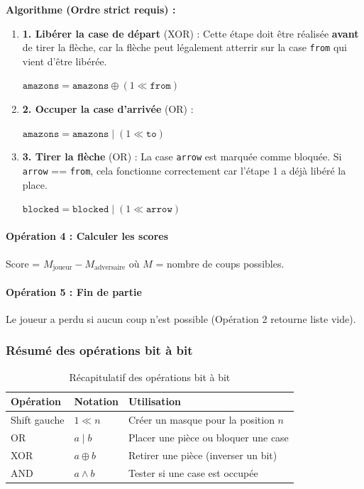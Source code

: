 \documentclass[a4paper]{article}
\begin{document}
\textbf{Algorithme (Ordre strict requis) :}
\begin{enumerate}
    \item \textbf{1. Libérer la case de départ} (XOR) :
    Cette étape doit être réalisée \textbf{avant} de tirer la flèche, car la flèche peut légalement atterrir sur la case \texttt{from} qui vient d'être libérée.
    \begin{center}
    $\texttt{amazons} = \texttt{amazons} \oplus (1 \ll \texttt{from})$
    \end{center}
    
    \item \textbf{2. Occuper la case d'arrivée} (OR) :
    \begin{center}
    $\texttt{amazons} = \texttt{amazons} \mid (1 \ll \texttt{to})$
    \end{center}
    
    \item \textbf{3. Tirer la flèche} (OR) :
    La case \texttt{arrow} est marquée comme bloquée. Si \texttt{arrow} == \texttt{from}, cela fonctionne correctement car l'étape 1 a déjà libéré la place.
    \begin{center}
    $\texttt{blocked} = \texttt{blocked} \mid (1 \ll \texttt{arrow})$
    \end{center}
\end{enumerate}

\paragraph{Opération 4 : Calculer les scores}

Score = $M_{\text{joueur}} - M_{\text{adversaire}}$ où $M$ = nombre de coups possibles.

\paragraph{Opération 5 : Fin de partie}

Le joueur a perdu si aucun coup n'est possible (Opération 2 retourne liste vide).

\subsubsection{Résumé des opérations bit à bit}

\begin{table}[H]
\centering
\begin{tabular}{lll}
\toprule
\textbf{Opération} & \textbf{Notation} & \textbf{Utilisation} \\
\midrule
Shift gauche & $1 \ll n$ & Créer un masque pour la position $n$ \\
OR & $a \mid b$ & Placer une pièce ou bloquer une case \\
XOR & $a \oplus b$ & Retirer une pièce (inverser un bit) \\
AND & $a \land b$ & Tester si une case est occupée \\
\bottomrule
\end{tabular}
\caption{Récapitulatif des opérations bit à bit}
\end{table}
\end{document}
